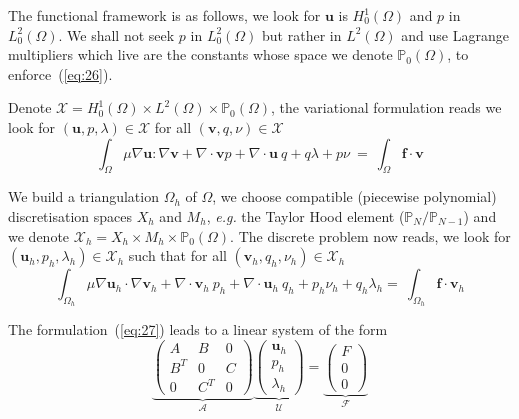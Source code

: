 The functional framework is as follows, we look for $\mathbf{u}$ is
$H^1_0(\Omega)$ and $p$ in $L^2_0(\Omega)$. We shall not seek $p$ in
$L^2_0(\Omega)$ but rather in $L^2(\Omega)$ and use Lagrange
multipliers which live are the constants whose space we denote
$\mathbb{P}_0(\Omega)$, to enforce~(\ref{eq:26}).

Denote $\mathcal{X} = H^1_0(\Omega)\times
L^2(\Omega)\times\mathbb{P}_0(\Omega)$, the variational formulation
reads we look for $(\mathbf{u}, p, \lambda) \in \mathcal{X}$ for all
$(\mathbf{v},q,\nu) \in \mathcal{X}$
\begin{equation}
  \label{eq:25}
  \int_\Omega \mu \nabla \mathbf{u} : \nabla \mathbf{v} + \nabla \cdot \mathbf{v} p + \nabla \cdot \mathbf{u}\ q + q \lambda + p \nu  \ = \ \int_\Omega \mathbf{f} \cdot \mathbf{v}
\end{equation}

We build a triangulation $\Omega_h$ of $\Omega$, we choose compatible
(piecewise polynomial) discretisation spaces $X_h$ and $M_h$,
\emph{e.g.} the Taylor Hood element ($\mathbb{P}_N/\mathbb{P}_{N-1}$)
and we denote $\mathcal{X}_h=X_h\times M_h \times
\mathbb{P}_0(\Omega)$.  The discrete problem now reads, we look for
$(\mathbf{u}_h,p_h,\lambda_h) \in \mathcal{X}_h$ such that for all
$(\mathbf{v}_h,q_h,\nu_h) \in \mathcal{X}_h$
\begin{equation}
  \label{eq:27}
  \int_{\Omega_h} \mu \nabla \mathbf{u}_h \cdot \nabla \mathbf{v}_h + \nabla \cdot \mathbf{v}_h \ p_h + \nabla \cdot \mathbf{u}_h\ q_h + p_h \nu_h + q_h \lambda_h   = \ \int_{\Omega_h} \mathbf{f} \cdot \mathbf{v}_h
\end{equation}

The formulation~(\ref{eq:27}) leads to a linear system of the form
\begin{equation}
  \label{eq:28}
  \underbrace{\begin{pmatrix}
    A & B & 0\\
    B^T & 0 & C\\
    0 & C^T & 0
  \end{pmatrix}}_{\mathcal{A}}
\underbrace{
  \begin{pmatrix}
    \mathbf{u}_h\\
    p_h\\
    \lambda_h
  \end{pmatrix}}_{\mathcal{U}} =
\underbrace{\begin{pmatrix}
    F\\
    0\\
    0
  \end{pmatrix}}_{\mathcal{F}}
\end{equation}

